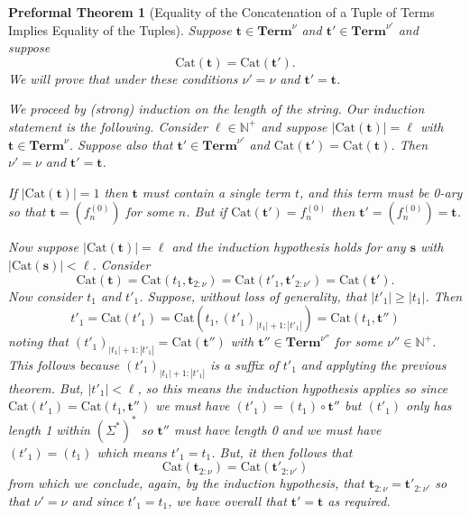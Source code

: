 \documentclass[oneside, 12pt]{book}
\theoremstyle{break}
\newtheorem{preformal definition}[definition]{Preformal Definition}
\newtheorem{preformal theorem}[theorem]{Preformal Theorem}
\newcommand{\bv}[1]{\boldsymbol{#1}}
\newcommand{\N}[0]{\mathbb{N}}
\newcommand{\norm}[1]{\left|#1\right|}
\begin{document}
		\begin{preformal theorem}[Equality of the Concatenation of a Tuple of Terms Implies Equality of the Tuples]
			Suppose $\bv{t} \in \textbf{Term}^{\nu}$ and $\bv{t}' \in \textbf{Term}^{\nu'}$ and suppose
			\begin{equation*}
				\text{Cat}(\bv{t}) = \text{Cat}(\bv{t}').
			\end{equation*}
			We will prove that under these conditions $\nu'=\nu$ and $\bv{t}' = \bv{t}$.
			
			We proceed by (strong) induction on the length of the string.
			Our induction statement is the following.
			Consider $\ell\in \N^+$ and suppose $\norm{\text{Cat}(\bv{t})} = \ell$ with $\bv{t} \in \textbf{Term}^{\nu}$. 
			Suppose also that $\bv{t}' \in \textbf{Term}^{\nu'}$ and $\text{Cat}(\bv{t}') = \text{Cat}(\bv{t})$.
			Then $\nu' = \nu$ and $\bv{t}' = \bv{t}$.
			
			If $\norm{\text{Cat}(\bv{t})} = 1$ then $\bv{t}$ must contain a single term $t$, and this term must be 0-ary so that $\bv{t} = (f_n^{(0)})$ for some $n$.
			But if $\text{Cat}(\bv{t}') = f_n^{(0)}$ then $\bv{t}' = (f_n^{(0)}) = \bv{t}$.
			
			Now suppose $\norm{\text{Cat}(\bv{t})} = \ell$ and the induction hypothesis holds for any $\bv{s}$ with $\norm{\text{Cat}(\bv{s})} < \ell$.
			Consider
			\begin{equation*}
				\text{Cat}(\bv{t}) = \text{Cat}(t_1, \bv{t}_{2:\nu}) = \text{Cat}(t'_1, \bv{t}'_{2:\nu'}) = \text{Cat}(\bv{t}').
			\end{equation*}
			Now consider $t_1$ and $t'_1$.
			Suppose, without loss of generality, that $\norm{t'_1} \ge \norm{t_1}$. 
			Then
			\begin{equation*}
				t'_1 = \text{Cat}(t'_1) = \text{Cat}(t_1, (t'_1)_{\norm{t_1}+1:\norm{t'_1}}) = \text{Cat}(t_1, \bv{t}'')
			\end{equation*}
			noting that $(t'_1)_{\norm{t_1}+1:\norm{t'_1}} = \text{Cat}(\bv{t}'')$ with $\bv{t}'' \in \textbf{Term}^{\nu''}$ for some $\nu'' \in \N^+$.
			This follows because $(t'_1)_{\norm{t_1}+1:\norm{t'_1}}$ is a suffix of $t'_1$ and applyting the previous theorem.
			But, $\norm{t'_1} < \ell$, so this means the induction hypothesis applies so since $\text{Cat}(t'_1) = \text{Cat}(t_1, \bv{t}'')$ we must have $(t'_1) = (t_1) \circ \bv{t}''$ but $(t'_1)$ only has length 1 within $(\Sigma^*)^*$ so $\bv{t}''$ must have length 0 and we must have $(t'_1) = (t_1)$ which means $t'_1 = t_1$.
			But, it then follows that
			\begin{equation*}
				\text{Cat}(\bv{t}_{2:\nu}) = \text{Cat}(\bv{t}'_{2:\nu'})
			\end{equation*}
			from which we conclude, again, by the induction hypothesis, that $\bv{t}_{2:\nu} = \bv{t}'_{2:\nu'}$ so that $\nu' = \nu$ and since $t'_1 = t_1$, we have overall that $\bv{t}' = \bv{t}$ as required.			
		\end{preformal theorem}
		
\end{document}
